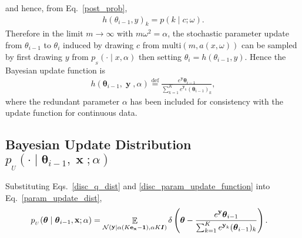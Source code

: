 \documentclass[11pt,table]{article}
\DeclareMathOperator*{\E}{\mathbb{E}}
\DeclareMathOperator{\x}{\mathbf{x}}
\DeclareMathOperator{\y}{\mathbf{y}}
\newcommand{\N}[2]{\mathcal{N}\left(#1 , #2\right)}
\newcommand{\I}[1]{\boldsymbol{I}}
\newcommand*{\defeq}{\stackrel{\text{def}}{=}}
\newcommand{\tidx}[2]{#1_{#2}}
\renewcommand{\vec}[1]{\boldsymbol{#1}}
\newcommand{\pars}{\theta}
\newcommand{\parsn}{\vec{\pars}}
\newcommand{\parsnt}[1]{\tidx{\parsn}{#1}}
\newcommand{\0}[1]{\constvec{0}{#1}}
\newcommand{\1}[1]{\constvec{1}{#1}}
\newcommand{\oh}[2]{\mathbf{e}_{#1}}
\newcommand{\sender}[2]{p_{_S}\left(#1 \mid #2\right)}
\newcommand{\update}{p_{_U}}
\begin{document}
and hence, from Eq.~\ref{post_prob},
\begin{align}
h(\theta_{i-1}, y)_k = p(k\mid c;\omega).
\end{align}
Therefore in the limit $m\rightarrow \infty$ with $m\omega^2 = \alpha$, the stochastic parameter update from $\theta_{i-1}$ to $\theta_{i}$ induced by drawing $c$ from $\text{multi}(m, a(x, \omega))$ can be sampled by first drawing $y$ from $\sender{\cdot}{x,\alpha}$ then setting $\theta_{i} = h(\theta_{i-1}, y)$.
Hence the Bayesian update function is 
\begin{align}
h(\parsnt{i-1}, \y, \alpha) \defeq \frac{e^{\y}\parsnt{i-1}}{\sum_{k=1}^K e^{\y_k}(\parsnt{i-1})_{k}},\label{disc_param_update_function}
\end{align}
where the redundant parameter $\alpha$ has been included for consistency with the update function for continuous data.
\subsection{Bayesian Update Distribution \texorpdfstring{$\update(\cdot \mid \parsnt{i-1}, \x; \alpha)$}{}}
Substituting Eqs.~\ref{disc_q_dist} and \ref{disc_param_update_function} into Eq.~\ref{param_update_dist},
\begin{align}
\update(\parsn \mid \parsnt{i-1}, \x; \alpha) &= \E_{\N{\y \mid \alpha\left(K \oh{\x}{KD} - \1{KD}\right)}{\alpha K \I{KD}}} \delta\left(\parsn - \frac{e^{\y}\parsnt{i-1}}{\sum_{k=1}^K e^{\y_k}(\parsnt{i-1})_{k}}\right).\label{disc_par_update_def}
\end{align}
\end{document}
